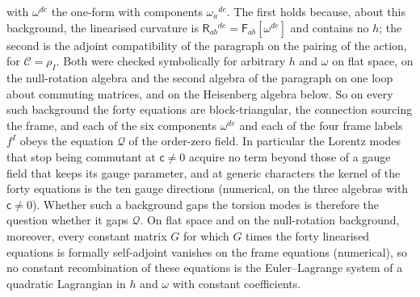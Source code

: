 with \(\omega^{de}\) the one-form with components \(\omega_a{}^{de}\). The first holds because, about this background, the linearised curvature is \(\mathsf R_{ab}{}^{de}=\mathsf F_{ab}[\omega^{de}]\) and contains no \(h\); the second is the adjoint compatibility of the paragraph on the pairing of the action, for \(\mathcal C=\rho_I\). Both were checked symbolically for arbitrary \(h\) and \(\omega\) on flat space, on the null-rotation algebra and the second algebra of the paragraph on one loop about commuting matrices, and on the Heisenberg algebra below. So on every such background the forty equations are block-triangular, the connection sourcing the frame, and each of the six components \(\omega^{de}\) and each of the four frame labels \(f^I\) obeys the equation \(\mathcal Q\) of the order-zero field. In particular the Lorentz modes that stop being commutant at \(\mathsf c\neq0\) acquire no term beyond those of a gauge field that keeps its gauge parameter, and at generic characters the kernel of the forty equations is the ten gauge directions (numerical, on the three algebras with \(\mathsf c\neq0\)). Whether such a background gaps the torsion modes is therefore the question whether it gaps \(\mathcal Q\). On flat space and on the null-rotation background, moreover, every constant matrix \(G\) for which \(G\) times the forty linearised equations is formally self-adjoint vanishes on the frame equations (numerical), so no constant recombination of these equations is the Euler--Lagrange system of a quadratic Lagrangian in \(h\) and \(\omega\) with constant coefficients.

